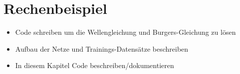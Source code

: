 %
%
%
%

\section{Rechenbeispiel\label{neuronal:section:rechenbeispiel}}

\begin{itemize}
    \item Code schreiben um die Wellengleichung und Burgers-Gleichung zu lösen
    \item Aufbau der Netze und Trainings-Datensätze beschreiben
    \item In diesem Kapitel Code beschreiben/dokumentieren
\end{itemize}